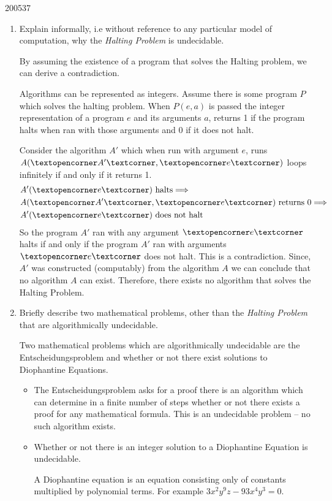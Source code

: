 \documentclass[10pt,\jkfside,a4paper]{article}
\begin{document}
\begin{examquestion}{2005}{3}{7}

\begin{enumerate}

\item Explain informally, i.e without reference to any particular model of
computation, why the \textit{Halting Problem} is undecidable.

By assuming the existence of a program that solves the Halting problem, we
can derive a contradiction.

\newcommand{\op}{\ensuremath{\textopencorner}}
\newcommand{\cl}{\ensuremath{\textcorner}}

Algorithms can be represented as integers. Assume there is some program
$P$ which solves the halting problem. When $P(e, a)$ is passed the integer
representation of a program $e$ and its arguments $a$, returns 1 if the
program halts when ran with those arguments and 0 if it does not halt.

Consider the algorithm $A'$ which when run with argument $e$, runs
$A(\op A' \cl, \op e \cl)$ loops infinitely if and only if it returns 1.
\begin{align*}
& A'(\op e \cl) \ \text{halts} \Longrightarrow \\
& A(\op A' \cl, \op e \cl) \ \text{returns 0} \Longrightarrow \\
& A'(\op e \cl) \ \text{does not halt}
\end{align*}
So the program $A'$ ran with any argument $\op e \cl$ halts if and only if
the program $A'$ ran with arguments $\op e \cl$ does not halt. This is a
contradiction. Since, $A'$ was constructed (computably) from the algorithm
$A$ we can conclude that no algorithm $A$ can exist. Therefore, there
exists no algorithm that solves the Halting Problem.

\item Briefly describe two mathematical problems, other than the
\textit{Halting Problem} that are algorithmically undecidable.

Two mathematical problems which are algorithmically
undecidable are the Entscheidungsproblem and whether or not there exist
solutions to Diophantine Equations.

\begin{itemize}

\item The Entscheidungsproblem asks for a proof there is an algorithm which
can determine in a finite number of steps whether or not there exists a proof
for any mathematical formula. This is an undecidable problem -- no such
algorithm exists.

\item Whether or not there is an integer solution to a Diophantine Equation
is undecidable.

A Diophantine equation is an equation consisting only of constants
multiplied by polynomial terms. For example $3 x^2 y^9 z - 93 x^4 y^3 = 0$.

\end{itemize}

\end{enumerate}

\end{examquestion}
\end{document}
